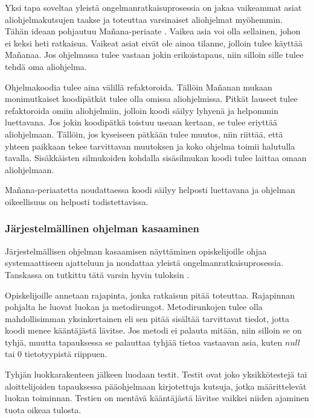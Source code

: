 Yksi tapa soveltaa yleistä ongelmanratkaisuprosessia on jakaa vaikeammat asiat
aliohjelmakutsujen taakse ja toteuttaa varsinaiset aliohjelmat myöhemmin. Tähän
ideaan pohjautuu Mañana-periaate \cite{Caspersen:2006:NPO:1176617.1176741}.
Vaikea asia voi olla sellainen, johon ei keksi heti ratkaisua. Vaikeat asiat
eivät ole ainoa tilanne, jolloin tulee käyttää Mañanaa. Jos ohjelmassa tulee
vastaan jokin erikoistapaus, niin silloin sille tulee tehdä oma aliohjelma.

Ohjelmakoodia tulee aina välillä refaktoroida. Tällöin Mañanan mukaan
monimutkaiset koodipätkät tulee olla omissa aliohjelmissa. Pitkät lauseet tulee
refaktoroida omiin aliohjelmiin, jolloin koodi säilyy lyhyenä ja helpommin
luettavana. Jos jokin koodipätkä toistuu useaan kertaan, se tulee eriyttää
aliohjelmaan. Tällöin, jos kyseiseen pätkään tulee muutos, niin riittää, että
yhteen paikkaan tekee tarvittavan muutoksen ja koko ohjelma toimii halutulla
tavalla. Sisäkkäisten silmukoiden kohdalla sisäsilmukan koodi tulee laittaa
omaan aliohjelmaan.

Mañana-periaatetta noudattaessa koodi säilyy helposti luettavana ja ohjelman
oikeellisuus on helposti todistettavissa.

\subsubsection{Järjestelmällinen ohjelman kasaaminen}

\label{järjestelmällisyyteen pohjautuva ongelmanratkaisuprosessi}

Järjestelmällisen ohjelman kasaamisen näyttäminen opiskelijoille ohjaa
systemaattiseen ajatteluun ja noudattaa yleistä ongelmanratkaisuprosessia.
Tanskassa on tutkittu tätä varsin hyvin tuloksin
\cite{Caspersen:2006:NPO:1176617.1176741}.

Opiskelijoille annetaan rajapinta, jonka ratkaisun pitää toteuttaa. Rajapinnan
pohjalta he luovat luokan ja metodirungot. Metodirunkojen tulee olla
mahdollisimman yksinkertainen eli sen pitää sisältää tarvittavat tiedot, jotta
koodi menee kääntäjästä lävitse. Jos metodi ei palauta mitään, niin silloin se
on tyhjä, muutta tapauksessa se palauttaa tyhjää tietoa vastaavan asia, kuten
$null$ tai $0$ tietotyypistä riippuen.

Tyhjän luokkarakenteen jälkeen luodaan testit. Testit ovat joko yksikkötestejä
tai aloittelijoiden tapauksessa pääohjelmaan kirjotettuja kutsuja, jotka
määrittelevät luokan toiminnan. Testien on mentävä kääntäjästä lävitse vaikkei
niiden ajaminen tuota oikeaa tulosta.

